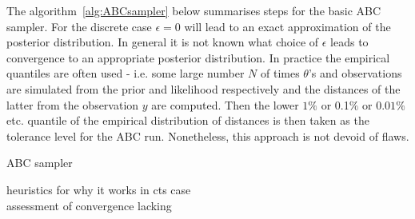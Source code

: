 \documentclass[fleqn,10pt]{SelfArx} %
\begin{document}
The algorithm~\ref{alg:ABCsampler} below summarises steps for the basic ABC sampler. For the discrete case $\epsilon = 0$ will lead to an exact approximation of the posterior distribution. In general it is not known what choice of $\epsilon$ leads to convergence to an appropriate posterior distribution. In practice the empirical quantiles are often used - i.e. some large number $N$ of times $\theta$'s and observations are simulated from the prior and likelihood respectively and the distances of the latter from the observation $y$ are computed. Then the lower $1\%$ or 0.1$\%$ or $0.01\%$ etc. quantile of the empirical distribution of distances is then taken as the tolerance level for the ABC run. Nonetheless, this approach is not devoid of flaws.

\begin{algorithm}\label{alg:ABCsampler}
 \caption{ABC sampler}
\end{algorithm}

heuristics for why it works in cts case\\
assessment of convergence lacking\\
\end{document}
